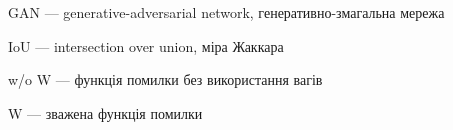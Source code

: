 GAN --- generative-adversarial network, генеративно-змагальна мережа

IoU --- intersection over union, міра Жаккара

w/o W --- функція помилки без використання вагів

W --- зважена функція помилки